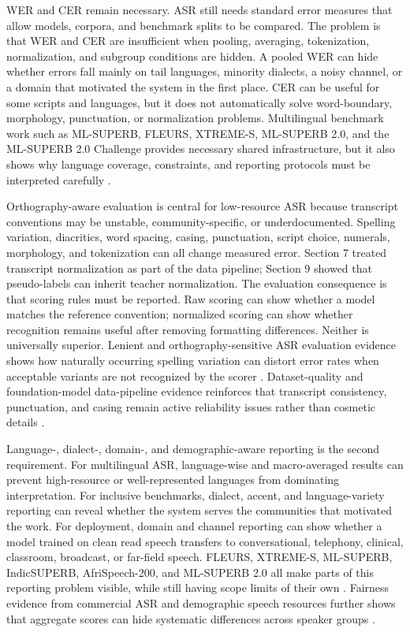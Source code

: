 \documentclass[pdflatex,sn-basic]{sn-jnl}
\theoremstyle{thmstyleone}
\theoremstyle{thmstyletwo}
\theoremstyle{thmstylethree}
\begin{document}
WER and CER remain necessary. ASR still needs standard error measures that allow models, corpora, and benchmark splits to be compared. The problem is that WER and CER are insufficient when pooling, averaging, tokenization, normalization, and subgroup conditions are hidden. A pooled WER can hide whether errors fall mainly on tail languages, minority dialects, a noisy channel, or a domain that motivated the system in the first place. CER can be useful for some scripts and languages, but it does not automatically solve word-boundary, morphology, punctuation, or normalization problems. Multilingual benchmark work such as ML-SUPERB, FLEURS, XTREME-S, ML-SUPERB 2.0, and the ML-SUPERB 2.0 Challenge provides necessary shared infrastructure, but it also shows why language coverage, constraints, and reporting protocols must be interpreted carefully \citep{shi2023mlsuperb,conneau2022fleurs,conneau2022xtreme_s,shi2024mlsuperb2,chen2025mlsuperb2challenge}.

Orthography-aware evaluation is central for low-resource ASR because transcript conventions may be unstable, community-specific, or underdocumented. Spelling variation, diacritics, word spacing, casing, punctuation, script choice, numerals, morphology, and tokenization can all change measured error. Section 7 treated transcript normalization as part of the data pipeline; Section 9 showed that pseudo-labels can inherit teacher normalization. The evaluation consequence is that scoring rules must be reported. Raw scoring can show whether a model matches the reference convention; normalized scoring can show whether recognition remains useful after removing formatting differences. Neither is universally superior. Lenient and orthography-sensitive ASR evaluation evidence shows how naturally occurring spelling variation can distort error rates when acceptable variants are not recognized by the scorer \citep{karita2023lenient}. Dataset-quality and foundation-model data-pipeline evidence reinforces that transcript consistency, punctuation, and casing remain active reliability issues rather than cosmetic details \citep{lau2025_data_quality_multilingual_speech,tian24_interspeech}.

Language-, dialect-, domain-, and demographic-aware reporting is the second requirement. For multilingual ASR, language-wise and macro-averaged results can prevent high-resource or well-represented languages from dominating interpretation. For inclusive benchmarks, dialect, accent, and language-variety reporting can reveal whether the system serves the communities that motivated the work. For deployment, domain and channel reporting can show whether a model trained on clean read speech transfers to conversational, telephony, clinical, classroom, broadcast, or far-field speech. FLEURS, XTREME-S, ML-SUPERB, IndicSUPERB, AfriSpeech-200, and ML-SUPERB 2.0 all make parts of this reporting problem visible, while still having scope limits of their own \citep{conneau2022fleurs,conneau2022xtreme_s,shi2023mlsuperb,javed2023indsuperb,olatunji2023_afrispeech200,shi2024mlsuperb2}. Fairness evidence from commercial ASR and demographic speech resources further shows that aggregate scores can hide systematic differences across speaker groups \citep{koenecke2020racialdisparities,liu2021casualconversations}.
\end{document}
